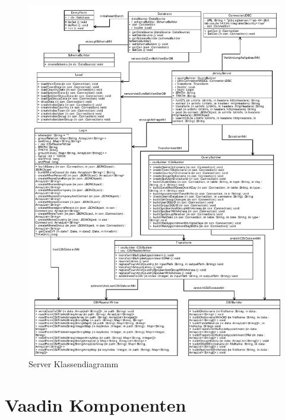 \begin{figure}[htbp]
\begin{center}
\includegraphics[width=1.0\textwidth]{pics/ServerKlassendiagramm.pdf}
\caption{Server Klassendiagramm}
\label{umsetzung_klassendiagramm_server}
\end{center}
\end{figure}

\section{Vaadin Komponenten}

